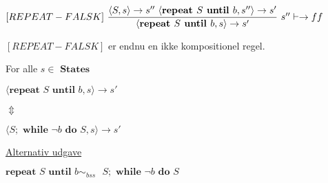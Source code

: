 \documentclass[a4paper,10pt,article]{memoir}
\theoremstyle{definition}
\begin{document}
$[REPEAT-FALSK ]\text{   } \dfrac{\langle S,s \rangle \rightarrow s'' \text{  } \langle \textbf{repeat } S \textbf{ until }b,s'' \rangle \rightarrow s'}{\langle \textbf{repeat } S \textbf{ until } b,s \rangle \rightarrow s'} \text{   } s'' \vdash \rightarrow ff$

$[REPEAT-FALSK]$ er endnu en ikke kompositionel regel.

\begin{saetning}
For alle $s \in \textbf{ States}$

$\langle \textbf{repeat } S \textbf{ until } b,s \rangle \rightarrow s'$

$\Updownarrow$

$\langle S; \textbf{ while } \neg b \textbf{ do } S,s \rangle \rightarrow s'$

\underline{Alternativ udgave}

$\textbf{repeat } S \textbf{ until } b \sim_{bss} \text{ } S; \textbf{ while } \neg b \textbf{ do }S$
\end{saetning}
\end{document}

